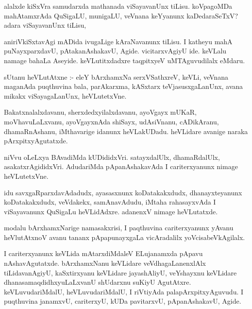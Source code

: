 \documentclass{article}
\begin{document}
\begin{mn}
alalxde kiSxVra samudarxda mathanada viSayavanUnx  tiLisu.  koVpagoMDa mahAtamxrAda
 QuSigaLU, munigaLU, veVnana keYyanunx kaDedaraSeTxV? adara viSayavanUnx tiLisu,
\end{mn}

\begin{mn}
aniriVkiSxtavAgi mADida ivugaLige kAraNavanunx tiLisu.  I katheyu mahA puNayxparxdavU, 
pAtakanAshakavU, Agide.  vicitarxvAgiyU ide. keVLalu namage bahaLa Aseyide.  
keVLutitxdadxre taqpitxyeV uMTAguvudilalx eMdaru.
\end{mn}

\begin{mn}
sUtanu heVLutAtxne :- eleY bArxhamxNa serxVSathxreV, keVLi, veVnana maganAda 
puqthuvina bala, parAkarxma, kASxtarx teVjasusxgaLanUnx, avana mikakx viSayagaLanUnx, heVLutetxVne.
\end{mn}

\begin{mn}
Bakatxnalalxdavanu, sherxdedxyilalxdavanu, ayoVgayx mUKaR, moVhavuLaLxvanu, 
ayoVgayxnAda shiSayx, udAsiVnanu, cADikAranu, dhamaRnAshanu, iMthavarige 
idanunx heVLakUDadu.  heVLidare avanige naraka pArxpitxyAgutatxde.
\end{mn}

\begin{mn}
niVvu oLeLxya BAvadiMda kUDididxVri. satayxdalUlx, dhamaRdalUlx, asakatxrAgididxVri.
 AdudariMda pApanAshakavAda  I cariterxyanunx nimage heVLutetxVne.
\end{mn}

\begin{mn}
idu savxgaRparxdavAdadudx, ayasasxnunx koDatakakxdudx, dhanayxteyanunx 
koDatakakxdudx, veVdakekx, samAnavAdudu, iMtaha rahasayxvAda I viSayavanunx 
QuSigaLu heVLidAdxre. adanenxV nimage heVLutatxde.
\end{mn}

\begin{mn}
modalu bArxhamxNarige namasakxrisi, I paqthuvina cariterxyanunx yAvanu 
heVlutAtxnoV avanu tananx pApapunayxgaLa vicAradalilx yoVcisabeVkAgilalx.
\end{mn}

\begin{mn}
I cariterxyanunx keVLida mAtarxdiMdaleV ELujanamxda pApavu nAshavAgutatxde.  
bArxhamxNanu keVLidare veVdhagaLanenxlAlx  tiLidavanAgiyU, kaSxtirxyanu 
keVLidare jayashAliyU,  veYshayxnu keVLidare dhanasamaqdidhxyuLaLxvanU 
shUdarxnu suKiyU AgutAtxre.  keVLuvudariMdalU, heVLuvudariMdalU, I riVtiyAda 
palapArxpitxyAguvudu.  I puqthuvina janamxvU,  cariterxyU, kUDa pavitarxvU, 
pApanAshakavU, Agide.
\end{mn}
\end{document}
